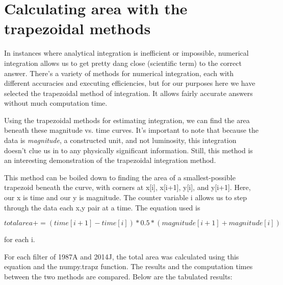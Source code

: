 \section{Calculating area with the trapezoidal methods}

In instances where analytical integration is inefficient or impossible, numerical integration allows us to get pretty dang close (scientific term) to the correct answer. There's a variety of methods for numerical integration, each with different accuracies and executing efficiencies, but for our purposes here we have selected the trapezoidal method of integration. It allows fairly accurate answers without much computation time.

Using the trapezoidal methods for estimating integration, we can find the area beneath these magnitude vs. time curves. It's important to note that because the data is \textit{magnitude}, a constructed unit, and not luminosity, this integration doesn't clue us in to any physically significant information. Still, this method is an interesting demonstration of the trapezoidal integration method.

This method can be boiled down to finding the area of a smallest-possible trapezoid beneath the curve, with corners at x[i], x[i+1], y[i], and y[i+1]. Here, our x is time and our y is magnitude. The counter variable i allows us to step through the data each x,y pair at a time. The equation used is 

\begin{equation}
	\label{fit_eq}
	total area += (time[i+1] - time[i])*0.5*(magnitude[i+1]+magnitude[i])
\end{equation}

for each i.

For each filter of 1987A and 2014J, the total area was calculated using this equation and the numpy.trapz function. The results and the computation times between the two methods are compared. Below are the tabulated results:

